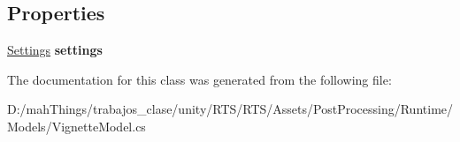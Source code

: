 \subsection*{Properties}
\begin{DoxyCompactItemize}
\item 
\mbox{\label{class_unity_engine_1_1_post_processing_1_1_vignette_model_a9bf7faa890c766df24f80fb30f62e761}} 
\mbox{\hyperlink{struct_unity_engine_1_1_post_processing_1_1_vignette_model_1_1_settings}{Settings}} {\bfseries settings}
\end{DoxyCompactItemize}


The documentation for this class was generated from the following file\+:\begin{DoxyCompactItemize}
\item 
D\+:/mah\+Things/trabajos\+\_\+clase/unity/\+R\+T\+S/\+R\+T\+S/\+Assets/\+Post\+Processing/\+Runtime/\+Models/Vignette\+Model.\+cs\end{DoxyCompactItemize}
